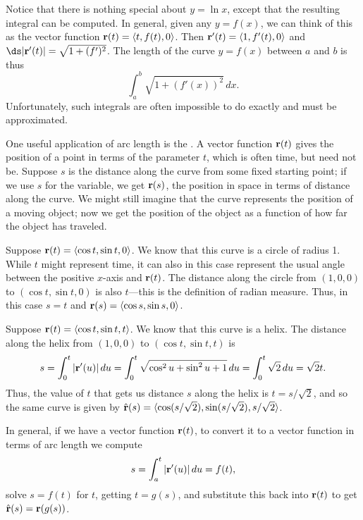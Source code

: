 Notice that there is nothing special about $y=\ln x$, except that the
resulting integral can be computed. In general, given any $y=f(x)$, we
can think of this as the vector function
${\bf r}(t)=\langle t,f(t),0\rangle$. Then 
${\bf r}'(t)=\langle 1,f'(t),0\rangle$ and
$\ds |{\bf r}'(t)|=\sqrt{1+(f')^2}$. The length of the curve $y=f(x)$
between $a$ and $b$ is thus
$$\int_a^b \sqrt{1+(f'(x))^2}\,dx.$$
Unfortunately, such integrals are often impossible to do exactly and
must be approximated.

One useful application of arc length is the .
A vector function ${\bf r}(t)$ gives the position of a point in terms of the
parameter $t$, which is often time, but need not be. Suppose $s$ is
the distance along the curve from some fixed starting point; if we use
$s$ for the variable, we get ${\bf r}(s)$, the position in space in
terms of distance along the curve. We might still imagine that the
curve represents the position of a moving object; now we get the
position of the object as a function of how far the object has
traveled.

\begin{example}{}{}
Suppose ${\bf r}(t)=\langle \cos t,\sin t,0\rangle$. We know
that this curve is a circle of radius 1. While $t$ might represent
time, it can also in this case represent the usual angle between the
positive $x$-axis and ${\bf r}(t)$. The distance along the circle from
$(1,0,0)$ to $(\cos t,\sin t,0)$ is also $t$---this is the
definition of radian measure. Thus, in this case $s=t$ and
${\bf r}(s)=\langle \cos s,\sin s,0\rangle$.
\end{example}

\begin{example}{}{}
Suppose ${\bf r}(t)=\langle \cos t,\sin t,t\rangle$. We know
that this curve is a helix. The distance along the helix from $(1,0,0)$
to $(\cos t,\sin t,t)$ is 
$$s=\int_0^t |{\bf r}'(u)|\,du=\int_0^t \sqrt{\cos^2u+\sin^2u+1}\,du=
\int_0^t \sqrt{2}\,du=\sqrt2t.$$
Thus, the value of $t$ that gets us distance $s$ along the helix is
$t=s/\sqrt2$, and so the same curve is given by $\hat{\bf r}(s)=
\langle \cos(s/\sqrt2),\sin(s/\sqrt2),s/\sqrt2\rangle$.
\end{example}

In general, if we have a vector function ${\bf r}(t)$, to convert it
to a vector function in terms of arc length we compute
$$s=\int_a^t |{\bf r}'(u)|\,du=f(t),$$
solve $s=f(t)$ for $t$, getting $t=g(s)$, and substitute this back
into ${\bf r}(t)$ to get $\hat{\bf r}(s)={\bf r}(g(s))$.

